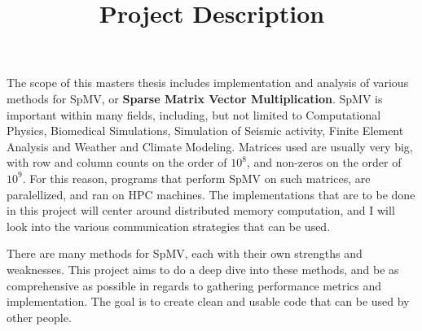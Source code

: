 \documentclass{article}
\title{Project Description}
\begin{document}
\maketitle

The scope of this masters thesis includes implementation and analysis of various methods for SpMV, or \textbf{Sparse Matrix Vector Multiplication}. SpMV is important within many fields, including, but not limited to Computational Physics, Biomedical Simulations, Simulation of Seismic activity, Finite Element Analysis and Weather and Climate Modeling. Matrices used are usually very big, with row and column counts on the order of \( 10^{8} \), and non-zeros on the order of \( 10^{9} \). For this reason, programs that perform SpMV on such matrices, are paralellized, and ran on HPC machines. The implementations that are to be done in this project will center around distributed memory computation, and I will look into the various communication strategies that can be used.
\medskip

There are many methods for SpMV, each with their own strengths and weaknesses. This project aims to do a deep dive into these methods, and be as comprehensive as possible in regards to gathering performance metrics and implementation. The goal is to create clean and usable code that can be used by other people.
\end{document}
